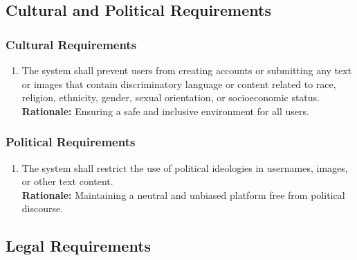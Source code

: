 \documentclass[]{article}
\begin{document}
\subsection{Cultural and Political Requirements}
\label{sub:cultural_and_political_requirements}

\subsubsection{Cultural Requirements}
\label{ssub:cultural_requirements}
\begin{enumerate}[{CP-C}1. ]
    \item The system shall prevent users from creating accounts or submitting any text or images that contain discriminatory language or content related to race, religion, ethnicity, gender, sexual orientation, or socioeconomic status.\\
    \textbf{Rationale:} Ensuring a safe and inclusive environment for all users.

\end{enumerate}

\subsubsection{Political Requirements}
\label{ssub:political_requirements}
\begin{enumerate}[{CP-P}1. ]
    \item The system shall restrict the use of political ideologies in usernames, images, or other text content.\\
    \textbf{Rationale:} Maintaining a neutral and unbiased platform free from political discourse.

\end{enumerate}


\subsection{Legal Requirements}
\label{sub:legal_requirements}
\end{document}
